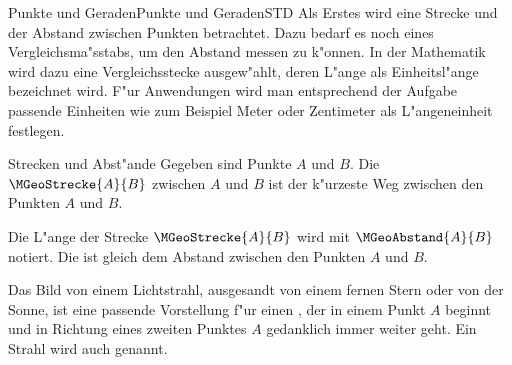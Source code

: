 \begin{MXContent}{Punkte und Geraden}{Punkte und Geraden}{STD}
Als Erstes wird eine Strecke und der Abstand zwischen Punkten betrachtet.
Dazu bedarf es noch eines Vergleichsma"sstabs, um den Abstand messen zu
k"onnen. In der Mathematik wird dazu eine Vergleichsstecke ausgew"ahlt, 
deren L"ange als Einheitsl"ange bezeichnet wird. F"ur Anwendungen wird 
man entsprechend der Aufgabe passende Einheiten wie zum Beispiel Meter 
oder Zentimeter als L"angeneinheit festlegen.

\begin{MXInfo}{Strecken und Abst"ande}
Gegeben sind Punkte $A$ und $B$. Die  
$\MGeoStrecke{A}{B}$ zwischen $A$ und $B$ ist der k"urzeste Weg zwischen den 
Punkten $A$ und $B$. 

\begin{center}
\end{center}

Die L"ange der Strecke $\MGeoStrecke{A}{B}$ wird mit $\MGeoAbstand{A}{B}$ 
notiert.  Die  ist gleich dem Abstand 
zwischen den Punkten $A$ und $B$.
\end{MXInfo}

Das Bild von einem Lichtstrahl, ausgesandt von einem fernen Stern oder 
von der Sonne, ist eine passende Vorstellung f"ur einen 
, der in einem Punkt $A$ beginnt und in Richtung eines
zweiten Punktes $A$ gedanklich immer weiter geht. Ein Strahl wird auch
 genannt.

\begin{center}
\end{center}


\end{MXContent}
